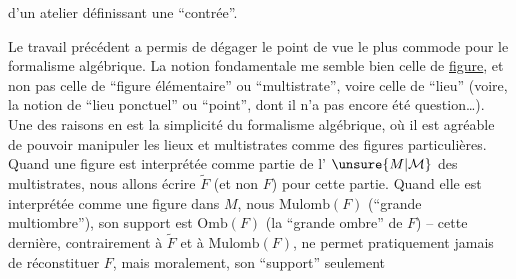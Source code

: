  d'un atelier définissant une ``contrée''.

Le travail précédent a permis de dégager le point de vue le plus commode pour le formalisme algébrique. La notion fondamentale me semble bien celle de \uline{figure}, et non pas celle de ``figure élémentaire'' ou ``multistrate'', voire celle de ``lieu'' (voire, la notion de ``lieu ponctuel'' ou ``point'', dont il n'a pas encore été question\ldots). Une des raisons en est la simplicité du formalisme algébrique,
%
 où il est agréable de pouvoir manipuler les lieux et multistrates comme  des figures particulières. Quand une figure  est interprétée  comme partie de l' $\unsure{M|\mathcal M}$  des multistrates, nous allons écrire $\widetilde F$ (et non $F$) pour cette partie. Quand elle est interprétée comme une figure  dans $M$, nous  $\mathrm{Mulomb}(F)$ (``grande multiombre''), son support est $\mathrm{Omb}(F)$ (la ``grande ombre'' de $F$) -- cette dernière, contrairement à $\widetilde F$ et à $\mathrm{Mulomb}(F)$, ne permet pratiquement jamais de réconstituer $F$,  mais moralement, son ``support'' seulement
